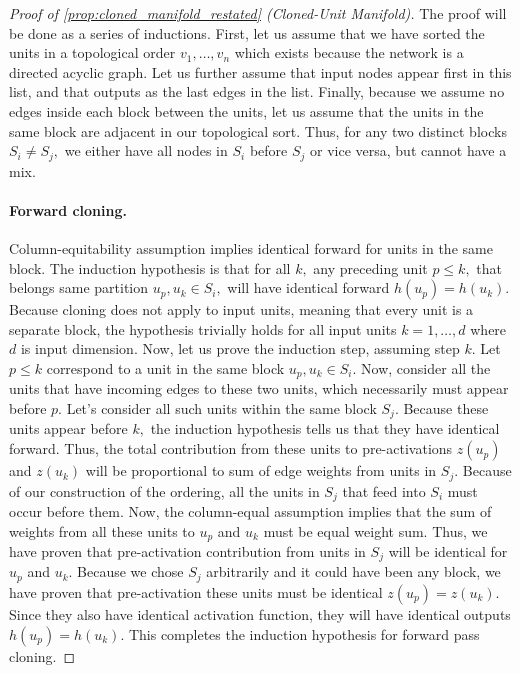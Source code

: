 \documentclass{article}
\numberwithin{figure}{section}
\begin{document}
\begin{proof}[Proof of \cref{prop:cloned_manifold_restated} (Cloned-Unit Manifold)]
The proof will be done as a series of inductions. 
First, let us assume that we have sorted the units in a topological order $v_1,\dots, v_n$ which exists because the network is a directed acyclic graph. Let us further assume that input nodes appear first in this list, and that outputs as the last edges in the list. Finally, because we assume no edges inside each block between the units, let us assume that the units in the same block are adjacent in our topological sort. Thus, for any two distinct blocks $S_i\neq S_j,$ we either have all nodes in $S_i$ before $S_j$ or vice versa, but cannot have a mix. 
\paragraph{Forward cloning.} Column-equitability assumption implies identical forward for units in the same block. The induction hypothesis is that for all $k,$ any preceding unit $p \le k,$ that belongs same partition  $ u_p, u_k \in S_i ,$  will have identical forward $h(u_p) = h(u_k). $ Because cloning does not apply to input units, meaning that every unit is a separate block, the hypothesis trivially holds for all input units $k=1,\dots, d$ where $d$ is input dimension. Now, let us prove the induction step, assuming step $k.$ Let $p\le k$ correspond to a unit in the same block $u_p,u_k  \in S_i. $ Now, consider all the units that have incoming edges to these two units, which necessarily must appear before $p$. Let's consider all such units within the same block $S_j.$ Because these units appear before $k,$ the induction hypothesis tells us that they have identical forward. Thus, the total contribution from these units to pre-activations $z(u_p)$ and $z(u_k)$ will be proportional to sum of edge weights from units in $S_j$. Because of our construction of the ordering, all the units in $S_j$ that feed into $S_i$ must occur before them. 
Now, the column-equal assumption implies that the sum of weights from all these units to $u_p $ and $u_k$ must be equal weight sum. Thus, we have proven that pre-activation contribution from units in  $S_j$ will be identical for $u_p$ and $u_k$. Because we chose $S_j$ arbitrarily and it could have been any block, we have proven that pre-activation these units must be identical $z(u_p)=z(u_k)$. Since they also have identical activation function, they will have identical outputs $h(u_p)=h(u_k)$. This completes the induction hypothesis for forward pass cloning. 

\end{proof}
\end{document}
